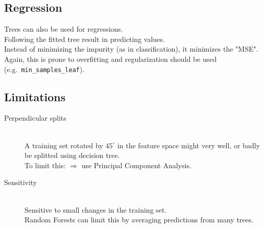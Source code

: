 \subsection{Regression}
Trees can also be used for regressions.\\
Following the fitted tree result in predicting values.\\
Instead of minimizing the impurity (as in classification), it minimizes the "MSE".\\
Again, this is prone to overfitting and regularization should be used (e.g.\ \verb;min_samples_leaf;).

\subsection{Limitations}
\begin{description}
    \item [Perpendicular splits] \hfill\\
    A training set rotated by $45^\circ$ in the feature space might very well, or badly be splitted using decision tree.\\
    To limit this: $\Rightarrow$ use Principal Component Analysis.
    \item [Sensitivity] \hfill\\
    Sensitive to small changes in the training set.\\
    Random Forests can limit this by averaging predictions from many trees.
\end{description}
